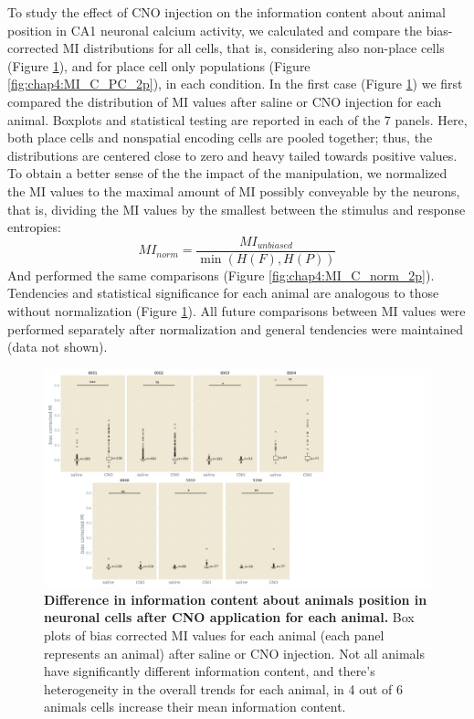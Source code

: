 To study the effect of CNO injection on the information content about animal position in CA1 neuronal calcium activity, we calculated and compare the bias-corrected MI distributions for all cells, that is, considering also non-place cells (Figure \ref{fig:chap4:MI_C_2p}), and for place cell only populations (Figure \ref{fig:chap4:MI_C_PC_2p}), in each condition.
In the first case (Figure \ref{fig:chap4:MI_C_2p}) we first compared the distribution of MI values after saline or CNO injection for each animal.
Boxplots and statistical testing are reported in each of the 7 panels.
Here, both place cells and nonspatial encoding cells are pooled together; thus, the distributions are centered close to zero and heavy tailed towards positive values.
To obtain a better sense of the the impact of the manipulation, we normalized the MI values to the maximal amount of MI possibly conveyable by the neurons, that is, dividing the MI values by the smallest between the stimulus and response entropies:
\begin{equation}
    MI_{norm} = \frac{MI_{unbiased}}{\min(H(F),H(P))}
\end{equation}
And performed the same comparisons (Figure \ref{fig:chap4:MI_C_norm_2p}).
Tendencies and statistical significance for each animal are analogous to those without normalization (Figure \ref{fig:chap4:MI_C_2p}).
All future comparisons between MI values were performed separately after normalization and general tendencies were maintained (data not shown).
\begin{figure}[h]
    \centering
    \includegraphics[trim={0 0 160 0}, clip, width=\textwidth]{Figures/Chapter4/MI_C_all_cells_2p.pdf}
    \caption[Difference in information content about animals position in neuronal cells after CNO application for each animal]{\textbf{Difference in information content about animals position in neuronal cells after CNO application for each animal.} 
    Box plots of bias corrected MI values for each animal (each panel represents an animal) after saline or CNO injection. 
    Not all animals have significantly different information content, and there's heterogeneity in the overall trends for each animal, in 4 out of 6 animals cells increase their mean information content.}
    \label{fig:chap4:MI_C_2p}
\end{figure}
